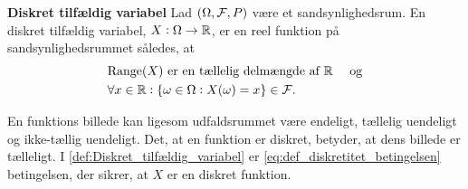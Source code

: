 
\begin{minipage}\textwidth
\begin{defn}\label{def:Diskret_tilfældig_variabel}\textbf{Diskret tilfældig variabel} %
\newline
Lad $(\Omega, \mathcal{F}, P)$ være et sandsynlighedsrum. En diskret tilfældig variabel, $X:\Omega \to \mathbb{R}$, er en reel funktion på sandsynlighedsrummet således, at
%
\begin{align}
    &\text{$\text{Range}(X)$ er en tællelig delmængde af $\R$ } \quad \text{og}\label{eq:def_diskretitet_betingelsen}\\
    &\forall x\in \R: \{\omega\in \Omega: X(\omega)=x\}\in %
    \F. \label{eq:def_tilfældig_variabel}
\end{align}

\end{defn}
\end{minipage}

En funktions billede kan ligesom udfaldsrummet være endeligt, tællelig uendeligt og ikke-tællig uendeligt. Det, at en funktion er diskret, betyder, at dens billede er tælleligt. 
I \autoref{def:Diskret_tilfældig_variabel} er
\eqref{eq:def_diskretitet_betingelsen} betingelsen, der sikrer, at $X$ er en diskret funktion.









